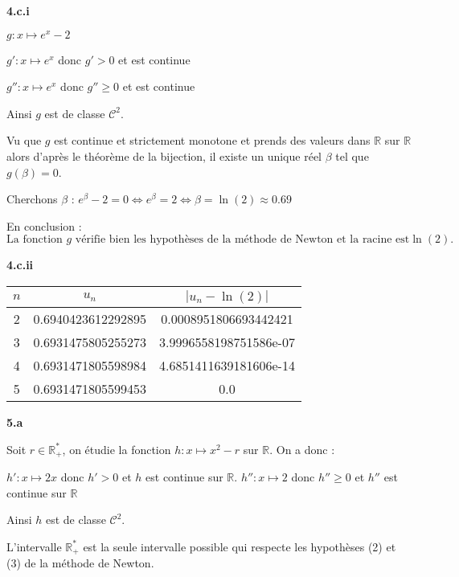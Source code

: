 \documentclass[11pt]{article}
\newcommand{\R}{\mathbb{R}}
\begin{document}
\vspace{10px}
\textbf{4.c.i}

$g: x \mapsto e^x-2$

$g': x \mapsto e^x$ donc $g' > 0$ et est continue

$g'': x \mapsto e^x$ donc $g'' \geq 0$ et est continue

\noindent Ainsi $g$ est de classe $\mathcal{C}^2$.

\noindent Vu que $g$ est continue et strictement monotone et prends des valeurs dans $\R$ sur $\R$ alors d'après le théorème de la bijection, il existe un unique réel $\beta$ tel que $g(\beta) = 0$.

\noindent Cherchons $\beta$ : $e^{\beta} - 2 = 0 \Leftrightarrow e^{\beta} = 2 \Leftrightarrow \beta = \ln(2) \approx 0.69$

\noindent En conclusion :
\vspace{8px}
\[\boxed{\text{La fonction } g \text{ vérifie bien les hypothèses de la méthode de Newton et la racine est} \ln(2).}\]

\vspace{15px}
\textbf{4.c.ii}

\vspace{-5px}
\renewcommand{\arraystretch}{1.5}
\begin{center}
\begin{tabular}{ c|c|c }
 $n$ & $u_n$ & $|u_n - \ln(2)|$ \\ 
 \hline
 \hline
 2 & 0.6940423612292895 & 0.0008951806693442421 \\
 \hline
 3 & 0.6931475805255273 & 3.9996558198751586e-07 \\ 
 \hline
 4 & 0.6931471805598984 & 4.6851411639181606e-14 \\ 
 \hline
 5 & 0.6931471805599453 & 0.0 \\ 
 \hline
\end{tabular}
\end{center}

\newpage
\textbf{5.a}

\noindent Soit $r\in\R^*_+$, on étudie la fonction $h: x \mapsto x^2-r$ sur $\R$. On a donc :

$h': x \mapsto 2x$ donc $h' > 0$ et $h$ est continue sur $\R$.
$h'': x \mapsto 2$ donc $h'' \geq 0$ et $h''$ est continue sur $\R$

\noindent Ainsi $h$ est de classe $\mathcal{C}^2$.

\noindent L'intervalle $\R^*_+$ est la seule intervalle possible qui respecte les hypothèses (2) et (3) de la méthode de Newton.
\end{document}
